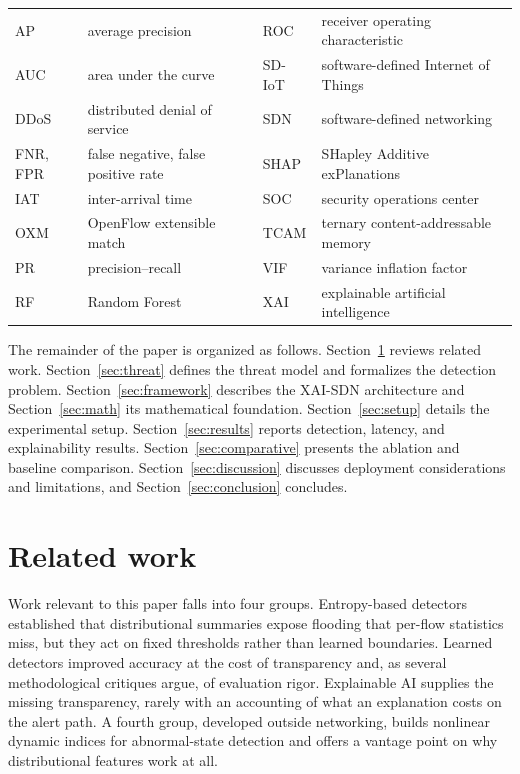 \documentclass{ieeeaccess}
\begin{document}
\begin{table}[!t]
\begin{tabular}{@{}llll@{}}
\midrule
AP & average precision & ROC & receiver operating characteristic \\
AUC & area under the curve & SD-IoT & software-defined Internet of Things \\
DDoS & distributed denial of service & SDN & software-defined networking \\
FNR, FPR & false negative, false positive rate & SHAP & SHapley Additive exPlanations \\
IAT & inter-arrival time & SOC & security operations center \\
OXM & OpenFlow extensible match & TCAM & ternary content-addressable memory \\
PR & precision--recall & VIF & variance inflation factor \\
RF & Random Forest & XAI & explainable artificial intelligence \\
\bottomrule
\end{tabular}
\end{table}

The remainder of the paper is organized as follows. Section~\ref{sec:related} reviews related work. Section~\ref{sec:threat} defines the threat model and formalizes the detection problem. Section~\ref{sec:framework} describes the XAI-SDN architecture and Section~\ref{sec:math} its mathematical foundation. Section~\ref{sec:setup} details the experimental setup. Section~\ref{sec:results} reports detection, latency, and explainability results. Section~\ref{sec:comparative} presents the ablation and baseline comparison. Section~\ref{sec:discussion} discusses deployment considerations and limitations, and Section~\ref{sec:conclusion} concludes.

\section{Related work}
\label{sec:related}

Work relevant to this paper falls into four groups. Entropy-based detectors established that distributional summaries expose flooding that per-flow statistics miss, but they act on fixed thresholds rather than learned boundaries. Learned detectors improved accuracy at the cost of transparency and, as several methodological critiques argue, of evaluation rigor. Explainable AI supplies the missing transparency, rarely with an accounting of what an explanation costs on the alert path. A fourth group, developed outside networking, builds nonlinear dynamic indices for abnormal-state detection and offers a vantage point on why distributional features work at all.
\end{document}
